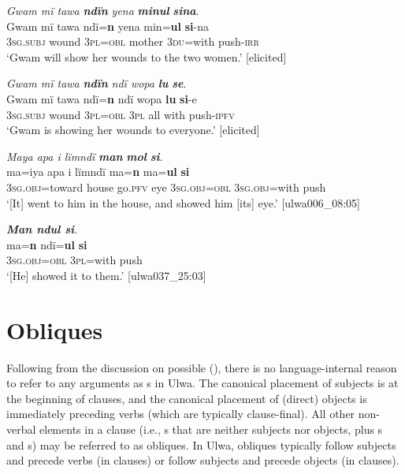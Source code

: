 \ea%
    \label{ex:clause:55}
          \textit{Gwam mï tawa} \textbf{\textit{ndïn}} \textit{yena} \textbf{\textit{minul}} \textbf{\textit{sina}}.\\
\gll Gwam  mï      tawa  ndï=\textbf{n}    yena    min=\textbf{ul}  \textbf{si}{}-na\\
    [name]  3\textsc{sg.subj}  wound  3\textsc{pl=obl}  mother    3\textsc{du}=with  push-\textsc{irr}\\
\glt `Gwam will show her wounds to the two women.’ [elicited]
\z

\ea%
    \label{ex:clause:56}
          \textit{Gwam mï tawa} \textbf{\textit{ndïn}} \textit{ndï wopa} \textbf{\textit{lu}} \textbf{\textit{se}}.\\
\gll Gwam  mï      tawa  ndï=\textbf{n}    ndï  wopa  \textbf{lu}    \textbf{si}{}-e\\
    [name]  \textsc{3sg.subj}  wound  3\textsc{pl=obl}  \textsc{3pl}  all    with  push-\textsc{ipfv}\\
\glt `Gwam is showing her wounds to everyone.’ [elicited]
\z

\ea%
    \label{ex:clause:57}
          \textit{Maya apa i lïmndï} \textbf{\textit{man}} \textbf{\textit{mol}} \textbf{\textit{si}}.\\
\gll ma=iya      apa    i    lïmndï  ma=\textbf{n}      ma=\textbf{ul} \textbf{si}\\
    3\textsc{sg.obj}=toward  house  go.\textsc{pfv}  eye    3\textsc{sg.obj=obl}  \textsc{3sg.obj}=with        push\\
\glt `[It] went to him in the house, and showed him [its] eye.’ [ulwa006\_08:05]
\z

\ea%
    \label{ex:clause:58}
          \textit{\textbf{Man ndul si}.}\\
\gll ma=\textbf{n}      ndï=\textbf{ul}    \textbf{si}\\
    3\textsc{sg.obj=obl}  \textsc{3pl}=with  push\\
\glt `[He] showed it to them.’ [ulwa037\_25:03]
\z

\section{Obliques}\label{sec:11.4}


Following from the discussion on possible  (), there is no language-internal reason to refer to any arguments as s in Ulwa. The canonical placement of subjects is at the beginning of clauses, and the canonical placement of  (direct) objects is immediately preceding verbs (which are typically clause-final). All other non-verbal elements in a clause (i.e., s that are neither subjects nor objects, plus s and s) may be referred to as obliques. In Ulwa, obliques typically follow subjects and precede verbs (in  clauses) or follow subjects and precede objects (in  clauses).

